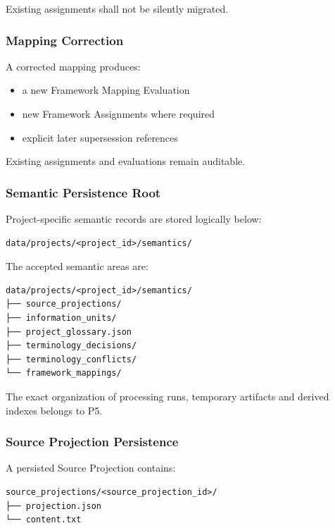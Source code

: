 Existing assignments shall not be silently migrated.

\hypertarget{mapping-correction}{%
\subsubsection{Mapping Correction}\label{mapping-correction}}

A corrected mapping produces:

\begin{itemize}
\tightlist
\item
  a new Framework Mapping Evaluation
\item
  new Framework Assignments where required
\item
  explicit later supersession references
\end{itemize}

Existing assignments and evaluations remain auditable.

\hypertarget{semantic-persistence-root}{%
\subsubsection{Semantic Persistence Root}\label{semantic-persistence-root}}

Project-specific semantic records are stored logically below:

\begin{verbatim}
data/projects/<project_id>/semantics/
\end{verbatim}

The accepted semantic areas are:

\begin{verbatim}
data/projects/<project_id>/semantics/
├── source_projections/
├── information_units/
├── project_glossary.json
├── terminology_decisions/
├── terminology_conflicts/
└── framework_mappings/
\end{verbatim}

The exact organization of processing runs, temporary artifacts and derived indexes belongs to P5.

\hypertarget{source-projection-persistence}{%
\subsubsection{Source Projection Persistence}\label{source-projection-persistence}}

A persisted Source Projection contains:

\begin{verbatim}
source_projections/<source_projection_id>/
├── projection.json
└── content.txt
\end{verbatim}


